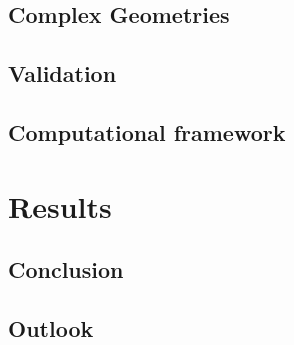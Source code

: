 \section{Complex Geometries}
\label{sec:recursivegreenfncalgorithm}

\section{Validation}

\section{Computational framework}

\chapter{Results}
\section{Conclusion}
\section{Outlook}
\appendix

\clearpage




